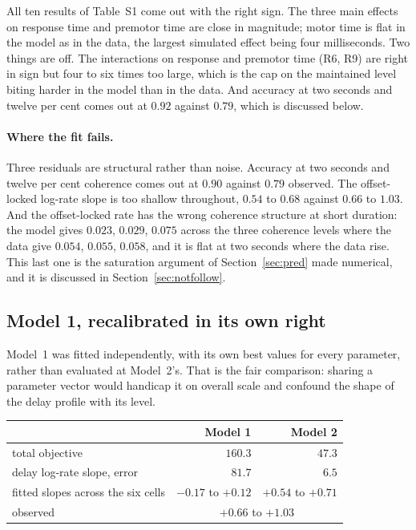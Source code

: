 \documentclass[a4paper,11pt]{article}
\newcommand{\1}{\mathbbm{1}}
\begin{document}
All ten results of Table~S1 come out with the right sign. The three main effects on
response time and premotor time are close in magnitude; motor time is flat in the model as
in the data, the largest simulated effect being four milliseconds. Two things are off. The
interactions on response and premotor time (R6, R9) are right in sign but four to six times
too large, which is the cap on the maintained level biting harder in the model than in the
data. And accuracy at two seconds and twelve per cent comes out at $0.92$ against $0.79$,
which is discussed below.

\paragraph{Where the fit fails.} Three residuals are structural rather than noise.
Accuracy at two seconds and twelve per cent coherence comes out at $0.90$ against
$0.79$ observed. The offset-locked log-rate slope is too shallow throughout, $0.54$ to
$0.68$ against $0.66$ to $1.03$. And the offset-locked rate has the wrong coherence
structure at short duration: the model gives $0.023$, $0.029$, $0.075$ across the three
coherence levels where the data give $0.054$, $0.055$, $0.058$, and it is flat at two
seconds where the data rise. This last one is the saturation argument of Section~\ref{sec:pred} made numerical,
and it is discussed in Section~\ref{sec:notfollow}.

\subsection{Model 1, recalibrated in its own right}

Model~1 was fitted independently, with its own best values for every parameter, rather
than evaluated at Model~2's. That is the fair comparison: sharing a parameter vector
would handicap it on overall scale and confound the shape of the delay profile with its
level.

\begin{center}
\begin{tabular}{lrr}
\toprule
& Model 1 & Model 2\\
\midrule
total objective & $160.3$ & $\mathbf{47.3}$\\
delay log-rate slope, error & $81.7$ & $\mathbf{6.5}$\\
fitted slopes across the six cells & $-0.17$ to $+0.12$ & $+0.54$ to $+0.71$\\
observed & \multicolumn{2}{c}{$+0.66$ to $+1.03$}\\
\bottomrule
\end{tabular}
\end{center}
\end{document}

